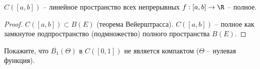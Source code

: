 \begin{corollary}
    $C([a, b])$ -- линейное пространство всех непрерывных $f: [a, b] \to \R$ -- полное.
\end{corollary}

\begin{proof}
    $C([a, b]) \subset B(E)$ (теорема Вейерштрасса). $C([a, b])$ -- полное как замкнутое подпространство (подмножество) полного пространства $B(E)$.
\end{proof}

\begin{problem}
    Покажите, что $\overline{B_{1}}(\Theta)$ в $C([0, 1])$ не является компактом ($\Theta$ -- нулевая функция). 
\end{problem}